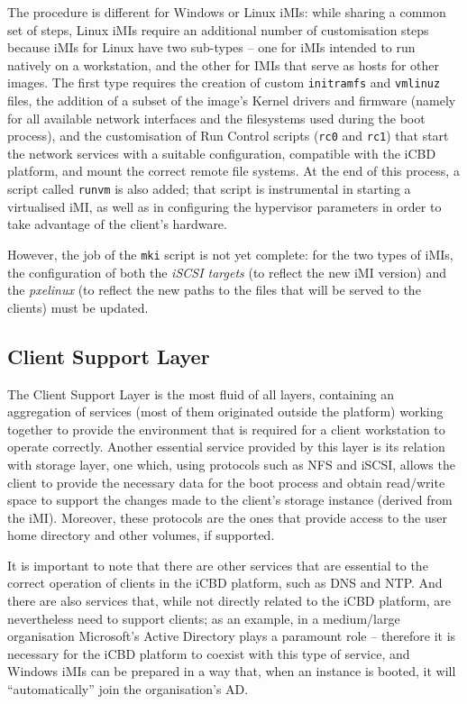 The procedure is different for Windows or Linux iMIs: while sharing a common set of steps, Linux iMIs require an additional number of customisation steps because iMIs for Linux have two sub-types – one for iMIs intended to run natively on a workstation, and the other for IMIs that serve as hosts for other images. The first type requires the creation of custom \texttt{initramfs} and \texttt{vmlinuz} files, the addition of a subset of the image's Kernel drivers and firmware (namely for all available network interfaces and the filesystems used during the boot process), and the customisation of Run Control scripts (\texttt{rc0} and \texttt{rc1}) that start the network services with a suitable configuration, compatible with the iCBD platform, and mount the correct remote file systems. At the end of this process, a script called \texttt{runvm} is also added; that script is instrumental in starting a virtualised iMI, as well as in configuring the hypervisor parameters in order to take advantage of the client’s hardware.

However, the job of the \texttt{mki} script is not yet complete: for the two types of iMIs, the configuration of both the \textit{iSCSI targets} (to reflect the new iMI version) and the \textit{pxelinux} (to reflect the new paths to the files that will be served to the clients) must be updated.


\subsection{Client Support Layer}
\label{sub:icbd_client_support_layer}

The Client Support Layer is the most fluid of all layers, containing an aggregation of services (most of them originated outside the platform) working together to provide the environment that is required for a client workstation to operate correctly. Another essential service provided by this layer is its relation with storage layer, one which, using protocols such as NFS and iSCSI, allows the client to provide the necessary data for the boot process and obtain read/write space to support the changes made to the client’s storage instance (derived from the iMI). Moreover, these protocols are the ones that provide access to the user home directory and other volumes, if supported.

It is important to note that there are other services that are essential to the correct operation of clients in the iCBD platform, such as DNS and NTP. And there are also services that, while not directly related to the iCBD platform, are nevertheless need to support clients; as an example, in a medium/large organisation Microsoft’s Active Directory plays a paramount role – therefore it is necessary for the iCBD platform to coexist with this type of service, and Windows iMIs can be prepared in a way that, when an instance is booted, it will “automatically” join the organisation’s AD.

